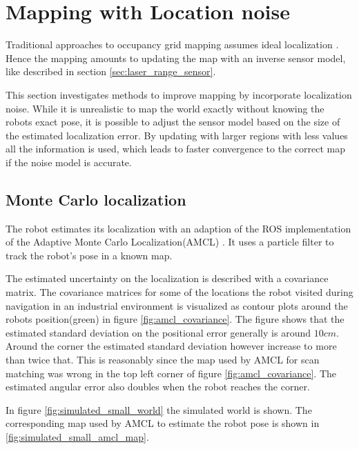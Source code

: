 \section{Mapping with Location noise}
\label{sec:mapping_with_location_noise}

Traditional approaches to occupancy grid mapping assumes ideal localization \cite{probRob}. 
Hence the mapping amounts to updating the map with an inverse sensor model, like described in section \vref{sec:laser_range_sensor}.

This section investigates methods to improve mapping by incorporate localization noise.
While it is unrealistic to map the world exactly without knowing the robots exact pose, it is possible to adjust the sensor model based on the size of the estimated localization error.
By updating with larger regions with less values all the information is used, which leads to faster convergence to the correct map if the noise model is accurate.

\subsection{Monte Carlo localization}
The robot estimates its localization with an adaption of the ROS implementation \cite{ros_amcl} of the Adaptive Monte Carlo Localization(AMCL) \cite{Thrun200199}. It uses a particle filter to track the robot's pose in a known map. 

The estimated uncertainty on the localization is described with a covariance matrix. The covariance matrices for some of the locations the robot visited during navigation in an industrial environment is visualized as contour plots around the robots position(green) in figure \vref{fig:amcl_covariance}. 
The figure shows that the estimated standard deviation on the positional error generally is around $10cm$. Around the corner the estimated standard deviation however increase to more than twice that. This is reasonably since the map used by AMCL for scan matching was wrong in the top left corner of figure \vref{fig:amcl_covariance}. The estimated angular error also doubles when the robot reaches the corner.

In figure \vref{fig:simulated_small_world} the simulated world is shown. The corresponding map used by AMCL to estimate the robot pose is shown in \vref{fig:simulated_small_amcl_map}.

